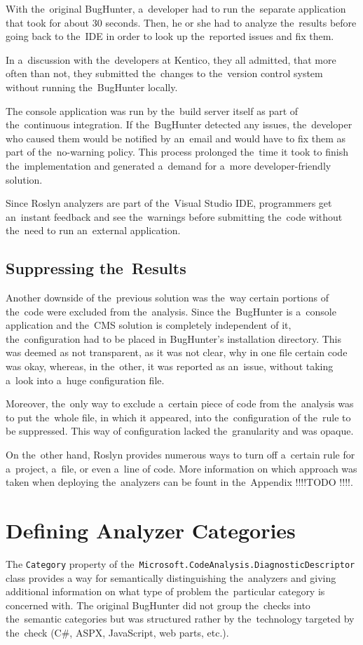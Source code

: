 \documentclass[
  digital, %
  table,   %
  lof,     %
  lot,     %
  oneside,
]{fithesis3}
\begin{document}
With the~original BugHunter, a~developer had to run the~separate application that took for about 30 seconds. Then, he or she had to analyze the~results before going back to the~IDE in order to look up the~reported issues and fix them. 

In a~discussion with the~developers at Kentico, they all admitted, that more often than not, they submitted the~changes to the~version control system without running the~BugHunter locally. 

The console application was run by the~build server itself as part of the~continuous integration. If the~BugHunter detected any issues, the~developer who caused them would be notified by an~email and would have to fix them as part of the~no-warning policy. This process prolonged the~time it took to finish the~implementation and generated a~demand for a~more developer-friendly solution. 

Since Roslyn analyzers are part of the~Visual Studio IDE, programmers get an~instant feedback and see the~warnings before submitting the~code without the~need to run an~external application.

\subsection{Suppressing the~Results}
Another downside of the~previous solution was the~way certain portions of the~code were excluded from the~analysis. Since the~BugHunter is a~console application and the~CMS solution is completely independent of it, the~configuration had to be placed in BugHunter's installation directory. This was deemed as not transparent, as it was not clear, why in one file certain code was okay, whereas, in the~other, it was reported as an~issue, without taking a~look into a~huge configuration file.

Moreover, the~only way to exclude a~certain piece of code from the~analysis was to put the~whole file, in which it appeared, into the~configuration of the~rule to be suppressed. This way of configuration lacked the~granularity and was opaque. 

On the~other hand, Roslyn provides numerous ways to turn off a~certain rule for a~project, a~file, or even a~line of code. More information on which approach was taken when deploying the~analyzers can be fount in the~Appendix !!!!TODO !!!!.

\section{Defining Analyzer Categories}
\label{sec:analyzer-categories}
The \texttt{Category} property of the~\texttt{Microsoft.CodeAnalysis.DiagnosticDescriptor} class provides a way for semantically distinguishing the~analyzers and giving additional information on what type of problem the~particular category is concerned with. The original BugHunter did not group the~checks into the~semantic categories but was structured rather by the~technology targeted by the~check (C\#, ASPX, JavaScript, web parts, etc.). 
\end{document}
